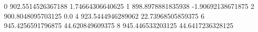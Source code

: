 0 902.5514526367188 1.74664306640625
1 898.8978881835938 -1.90692138671875
2 900.8048095703125 0.0
4 923.5444946289062 22.73968505859375
6 945.4256591796875 44.620849609375
8 945.446533203125 44.6417236328125

